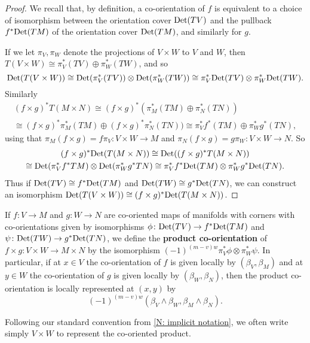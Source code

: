 \begin{proof}
	We recall that, by definition, a co-orientation of $f$ is equivalent to a choice of isomorphism between the orientation cover ${\rm Det}(TV)$ and the pullback $f^*{\rm Det}(TM)$ of the orientation cover ${\rm Det}(TM)$, and similarly for $g$.

	If we let $\pi_V, \pi_W$ denote the projections of $V \times W$ to $V$ and $W$, then $T(V \times W) \cong \pi_V^*(TV) \oplus \pi_W^*(TW)$, and so $${\rm Det}(T(V \times W)) \cong {\rm Det}(\pi_V^*(TV))\otimes{\rm Det}(\pi_W^*(TW)) \cong \pi_V^*{\rm Det}(TV)\otimes\pi_W^*{\rm Det}(TW).$$ Similarly
	\begin{multline*}(f \times g)^*T(M \times N) \cong (f \times g)^*(\pi_M^*(TM) \oplus \pi_N^*(TN))\\
		 \cong (f \times g)^*\pi_M^*(TM) \oplus (f \times g)^*\pi_N^*(TN)) \cong \pi_V^*f^*(TM) \oplus \pi_W^*g^*(TN),
	\end{multline*}
	using that $\pi_M(f \times g) = f\pi_V \colon V \times W \to M$ and $\pi_N(f \times g) = g\pi_W \colon V \times W \to N$.
	So
	\begin{multline*}
		(f \times g)^*{\rm Det}(T(M \times N)) \cong {\rm Det}((f \times g)^*T(M \times N))\\ \cong {\rm Det}(\pi_V^*f^*TM) \otimes {\rm Det}(\pi_W^*g^*TN) \cong \pi_V^*f^*{\rm Det}(TM) \otimes \pi_W^*g^*{\rm Det}(TN).
	\end{multline*}
	Thus if ${\rm Det}(TV) \cong f^*{\rm Det}(TM)$ and ${\rm Det}(TW) \cong g^*{\rm Det}(TN)$, we can construct an isomorphism ${\rm Det}(T(V \times W)) \cong (f \times g)^*{\rm Det}(T(M \times N))$.
\end{proof}

\begin{definition}\label{D: co-oriented exterior}
	If $f \colon V \to M$ and $g \colon W \to N$ are co-oriented maps of manifolds with corners with co-orientations given by isomorphisms $\phi \colon {\rm Det}(TV) \to f^*{\rm Det}(TM)$ and $\psi \colon {\rm Det}(TW) \to g^*{\rm Det}(TN)$, we define the \textbf{product co-orientation} of $f \times g \colon V \times W \to M \times N$ by the isomorphism $(-1)^{(m-v)w}\pi_V^*\phi \otimes \pi_W^*\psi$.
	In particular, if at $x \in V$ the co-orientation of $f$ is given locally by $(\beta_V,\beta_M)$ and at $y \in W$ the co-orientation of $g$ is given locally by $(\beta_W,\beta_N)$, then the product co-orientation is locally represented at $(x,y)$ by $$(-1)^{(m-v)w}(\beta_V \wedge \beta_W,\beta_M \wedge \beta_N).$$

	Following our standard convention from \cref{N: implicit notation}, we often write simply $V \times W$ to represent the co-oriented product.
\end{definition}

